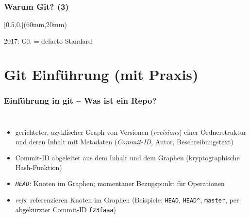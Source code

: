 \documentclass{beamer}
\begin{document}
\begin{frame}[label=why40]
\frametitle{Warum Git? (3)}

\begin{textblock*}{\textwidth}[0.5,0.](60mm,20mm)
\begin{center}%
\bigskip
{}
{
2017: Git = defacto Standard
}
\end{center}
\end{textblock*}


\end{frame}

\section{Git Einführung (mit Praxis)}
\begin{frame}
\frametitle{Einführung in git – Was ist ein Repo?}
\begin{columns}
  \begin{itemize}
  \item gerichteter, azyklischer Graph von Versionen
    (\emph{revisions}) einer Ordnerstruktur und deren Inhalt mit
    Metadaten (\emph{Commit-ID}, Autor, Beschreibungstext)
  \item Commit-ID abgeleitet aus dem Inhalt und dem Graphen
    (kryptographische Hash-Funktion)
  \item \emph{\texttt{HEAD}}: Knoten im Graphen; momentaner
    Bezugspunkt für Operationen
  \item \emph{refs}: referenzieren Knoten im Graphen (Beispiele:
    \texttt{HEAD}, \texttt{HEAD\^}, \texttt{master}, per abgekürzter
    Commit-ID \texttt{f23faaa})
  \end{itemize}
\end{columns}
\end{frame}
\end{document}
